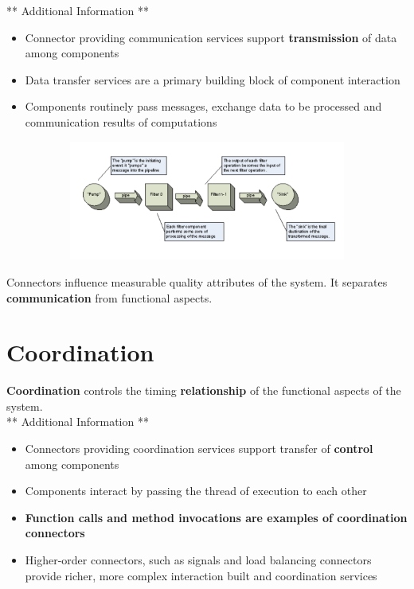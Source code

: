 \documentclass[a4paper]{report}
\begin{document}
** Additional Information **
\begin{itemize}
\item Connector providing communication services support \textbf{transmission} of data among components
\item Data transfer services are a primary building block of component interaction
\item Components routinely pass messages, exchange data to be processed and communication results of computations
\end{itemize}

\begin{figure}[H]
\centering
\hskip-2.5cm\begin{subfigure}{1\textwidth}
  \includegraphics[width=1\linewidth]
  {images/10-pipes.png}
\end{subfigure}
\end{figure}

Connectors influence measurable quality attributes of the system. It separates \textbf{communication} from functional aspects.
\section{Coordination}
\textbf{Coordination} controls the timing \textbf{relationship} of the functional aspects of the system. \\

** Additional Information ** 
\begin{itemize}
\item Connectors providing coordination services support transfer of \textbf{control} among components
\item Components interact by passing the thread of execution to each other
\item \textbf{Function calls and method invocations are examples of coordination connectors}
\item Higher-order connectors, such as signals and load balancing connectors provide richer, more complex interaction built and coordination services
\end{itemize}
\end{document}
